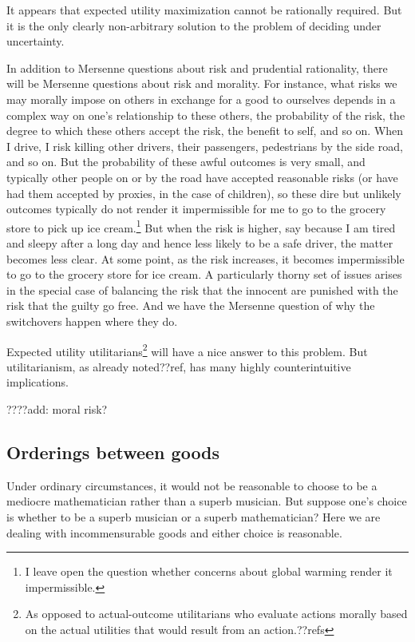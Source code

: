 It appears that expected utility maximization cannot be rationally required. But it is the only clearly non-arbitrary solution
to the problem of deciding under uncertainty.

In addition to Mersenne questions about risk and prudential rationality, there will be Mersenne questions about risk and morality.
For instance, what risks we may morally impose on others in exchange for a good to ourselves depends in a complex way 
on one's relationship to these others, the probability of the risk, the degree to which these others accept the risk, the 
benefit to self, and so on. When I drive, I risk killing other drivers, their passengers, pedestrians by the side road, and so on.
But the probability of these awful outcomes is very small, and typically other people on or by the road have accepted reasonable
risks (or have had them accepted by proxies, in the case of children), so these dire but unlikely outcomes typically do not render it impermissible for
me to go to the grocery store to pick up ice cream.\footnote{I leave open the question whether concerns about global warming 
render it impermissible.} But when the risk is higher, say because I am tired and sleepy after a long day and hence less likely to be
a safe driver, the matter becomes less clear. At some point, as the risk increases, it becomes impermissible to go to the grocery
store for ice cream. 
A particularly thorny set of issues arises in the special case of balancing the risk that the innocent are punished with the risk that the guilty go free.
And we have the Mersenne question of why the switchovers happen where they do.

Expected utility utilitarians\footnote{As opposed to actual-outcome utilitarians who evaluate actions morally based on the
actual utilities that would result from an action.??refs} will have a nice answer to this problem. But utilitarianism, as already
noted??ref, has many highly counterintuitive implications. 

????add: moral risk?

\subsection{Orderings between goods}
Under ordinary circumstances, it would not be reasonable to choose to be a mediocre mathematician rather than a superb musician. 
But suppose one's choice is whether to be a superb
musician or a superb mathematician? Here we are dealing with incommensurable goods and either choice is reasonable.

